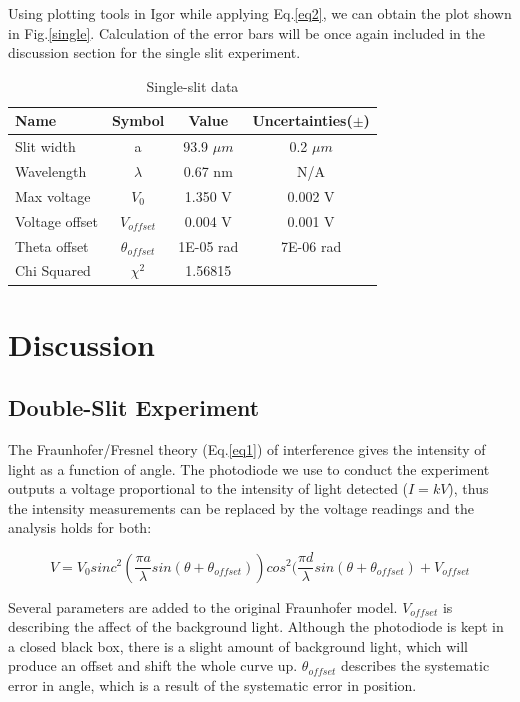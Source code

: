 \documentclass[prb,preprint]{revtex4-1}
\begin{document}
Using plotting tools in Igor while applying Eq.\ref{eq2}, we can obtain the plot shown in Fig.\ref{single}. Calculation of the error bars will be once again included in the discussion section for the single slit experiment.

\begin{table}[h]
\centering
\caption{Single-slit data}
\begin{ruledtabular}
\begin{tabular}{ l c c c}
Name & Symbol & Value & Uncertainties($\pm$)\\
\hline
Slit width & a & 93.9 $\mu m$ & 0.2 $\mu m$\\
Wavelength & $\lambda$ & 0.67 nm & N/A \\
Max voltage & $V_0$ & 1.350 V & 0.002 V\\
Voltage offset & $V_{offset}$ &  0.004 V & 0.001 V\\
Theta offset &$ \theta_{offset}$ & 1E-05 rad & 7E-06 rad \\

\hline
Chi Squared & $\chi^2$ & 1.56815 &
\end{tabular}
\end{ruledtabular}
\label{data}
\end{table}

\section{Discussion}

\subsection{Double-Slit Experiment}

The Fraunhofer/Fresnel theory (Eq.\ref{eq1}) of interference gives the intensity of light as a function of angle. The photodiode we use to conduct the experiment outputs a voltage proportional to the intensity of light detected ($I = kV$), thus the intensity measurements can be replaced by the voltage readings and the analysis holds for both:

\begin{equation}
V=V_0 sinc^2( \frac{\pi a}{\lambda} sin (\theta+\theta_{offset}))  cos^2(\frac{\pi d}{\lambda} sin (\theta+\theta_{offset}) + V_{offset}
\label{fitdouble}
\end{equation}

Several parameters are added to the original Fraunhofer model. $V_{offset}$ is describing the affect of the background light. Although the photodiode is kept in a closed black box, there is a slight amount of background light, which will produce an offset and shift the whole curve up. $\theta_{offset}$ describes the systematic error in angle, which is a result of the systematic error in position.\\
\end{document}
